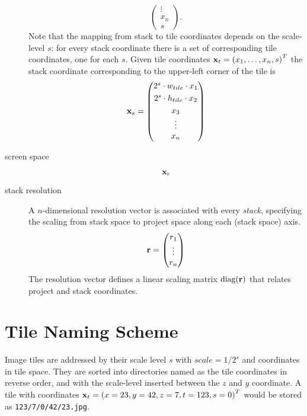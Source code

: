 \documentclass[a4paper,10pt]{article}
\newcommand{\vc}[1]{\ensuremath{\mathbf{#1}}}
\begin{document}
\begin{description}
\begin{equation}
\begin{pmatrix}
      \vdots \\
      x_n \\
      s
    \end{pmatrix}.
  \end{equation}
  Note that the mapping from stack to tile coordinates depends on the scale-level $s$:
  for every stack coordinate there is a set of corresponding tile coordinates, one for each $s$.
  Given tile coordinates $\xtile = \left( x_1, \dots,  x_n, s \right)^T$ the stack coordinate corresponding
  to the upper-left corner of the tile is
  \begin{equation}
    \xstack = \begin{pmatrix}
      2^{s} \cdot w_{tile} \cdot x_1 \\[1mm]
      2^{s} \cdot h_{tile} \cdot x_2 \\[1mm]
      x_3 \\
      \vdots \\
      x_n
    \end{pmatrix}
  \end{equation}
\item[screen space]
  \begin{equation}
    \vc{x}_r
  \end{equation}
\end{description}

\begin{description}
\item[stack resolution]
  A $n$-dimensional resolution vector is associated with every \emph{stack}, specifying the scaling from stack space to project space along each (stack space) axis.
  \begin{equation}
    \rstack = \begin{pmatrix}
        r_1 \\ \vdots \\ r_n
      \end{pmatrix}
  \end{equation}
  The resolution vector defines a linear scaling matrix $\Sstack$ that relates project and stack coordinates.
\end{description}


\section{Tile Naming Scheme}

Image tiles are addressed by their scale level $s$ with $scale = 1/2^s$ and coordinates in tile space.
They are sorted into directories named as the tile coordinates in reverse order, and with the scale-level inserted between the $z$ and $y$ coordinate.
A tile with coordinates $\xtile = \left( x = 23, y = 42, z = 7, t = 123, s = 0 \right)^T$ would be stored as
\texttt{123/7/0/42/23.jpg}.
\end{document}
